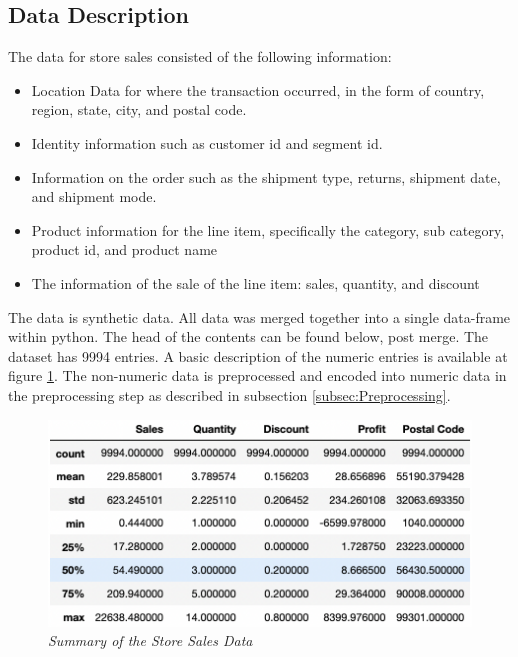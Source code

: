 \subsection{Data Description}

The data for store sales consisted of the following information: \cite{tableau_community_forums_2021}

\begin{itemize}
        \item Location Data for where the transaction occurred, in the form of country, region, state, city, and postal code.
        \item Identity information such as customer id and segment id.
        \item Information on the order such as the shipment type, returns, shipment date, and shipment mode.
        \item Product information for the line item, specifically the category, sub category, product id, and product name
        \item The information of the sale of the line item: sales, quantity, and discount
\end{itemize}

The data is synthetic data. All data was merged together into a single data-frame within python. The head of the contents can be found below, post merge. The dataset has 9994 entries. A basic description of the numeric entries is available at figure \ref{fig:ssd_stats}. The non-numeric data is preprocessed and encoded into numeric data in the preprocessing step as described in subsection \ref{subsec:Preprocessing}.

\begin{figure}[H]
	\centering
        \includegraphics[width=1.0\linewidth]{images/ssd_stats.png}
	\caption{\textit{Summary of the Store Sales Data}}
	\label{fig:ssd_stats}
\end{figure}

